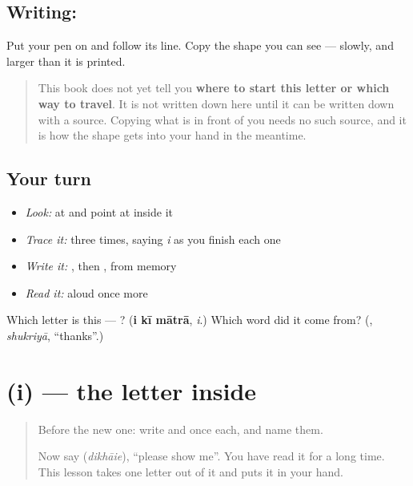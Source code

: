 \subsection*{Writing: }
Put your pen on  and follow its line. Copy the shape you can see — slowly, and larger than it is printed.

\begin{quote}
This book does not yet tell you \textbf{where to start this letter or which way to travel}. It is not written down here until it can be written down with a source. Copying what is in front of you needs no such source, and it is how the shape gets into your hand in the meantime.
\end{quote}

\subsection*{Your turn}
\begin{itemize}
\raggedright
  \item \emph{Look:} at \textbf{} and point at  inside it
  \item \emph{Trace it:}  three times, saying \emph{i} as you finish each one
  \item \emph{Write it:} , then , from memory
  \item \emph{Read it:} \textbf{} aloud once more
\end{itemize}

\begin{tcolorbox}[breakable,colback=teal!4,colframe=teal!35!black,title={Before you move on}]
Which letter is this — ? (\textbf{i kī mātrā}, \emph{i}.) Which word did it come from? (\textbf{}, \emph{shukriyā}, \textquotedblleft{}thanks\textquotedblright{}.)
\end{tcolorbox}
\section[\texorpdfstring{\hi{इ} (i)}{इ (i)}]{ (i) — the letter inside }

\label{lesson:HI-W128-letter-i}



\begin{quote}
Before the new one: write  and  once each, and name them.

Now say \textbf{} (\emph{dikhāie}), \textquotedblleft{}please show me\textquotedblright{}. You have read it for a long time. This lesson takes one letter out of it and puts it in your hand.
\end{quote}

